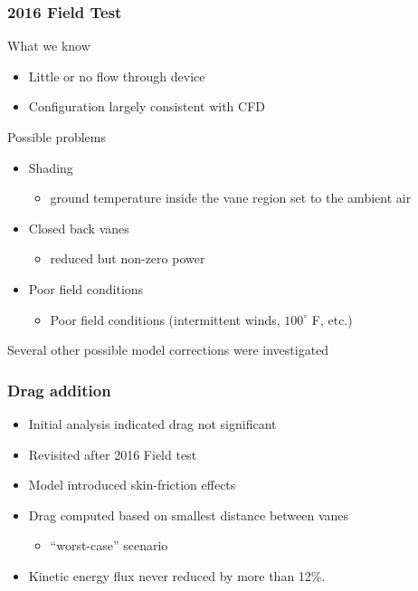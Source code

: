 \documentclass[mathserif]{beamer}
\begin{document}
%
%
%
\begin{frame}
 \frametitle{2016 Field Test}

\begin{block}{What we know}
\begin{itemize}
 \item Little or no flow through device
 \item Configuration largely consistent with CFD
\end{itemize}
\end{block}

\begin{block}{Possible problems}
\begin{itemize}
 \item Shading
       \begin{itemize}
	\item ground temperature inside the vane region set to the ambient air 
       \end{itemize}
 \item Closed back vanes
       \begin{itemize}
	\item reduced but non-zero power
       \end{itemize}
 \item Poor field conditions
       \begin{itemize}
	\item Poor field conditions (intermittent winds, $100^{\circ}$
	      F, etc.)  
       \end{itemize}
\end{itemize}
\end{block}

\bigbreak
\centering 
Several other possible model corrections were investigated

\end{frame}

%
%
%
\begin{frame}
 \frametitle{Drag addition}
\begin{itemize}
 \item Initial analysis indicated drag not significant
 \item Revisited after 2016 Field test
 \item Model introduced skin-friction effects
 \item Drag computed based on smallest distance between vanes
       \begin{itemize}
	\item ``worst-case'' scenario
       \end{itemize}
 \item Kinetic energy flux never reduced by more than 12\%.
\end{itemize}


\end{frame}
\end{document}
